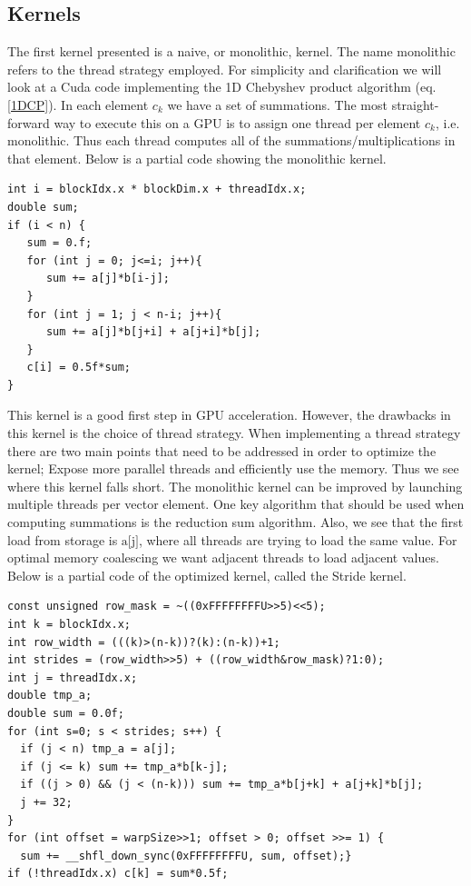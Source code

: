 \documentclass{article}
\begin{document}
\subsection{Kernels}
The first kernel presented is a naive, or monolithic, kernel. The name monolithic refers to the thread strategy employed. For simplicity and clarification we will look at a Cuda code implementing the 1D Chebyshev product algorithm (eq. \ref{1DCP}). In each element $c_k$ we have a set of summations. The most straight-forward way to execute this on a GPU is to assign one thread per element $c_k$, i.e. monolithic. Thus each thread computes all of the summations/multiplications in that element. Below is a partial code showing the monolithic kernel. 
\begin{lstlisting}[caption={Monolithic kernel}]
int i = blockIdx.x * blockDim.x + threadIdx.x;
double sum;
if (i < n) {
   sum = 0.f;
   for (int j = 0; j<=i; j++){
      sum += a[j]*b[i-j];
   }
   for (int j = 1; j < n-i; j++){
      sum += a[j]*b[j+i] + a[j+i]*b[j];
   }
   c[i] = 0.5f*sum;
}
\end{lstlisting}
This kernel is a good first step in GPU acceleration. However, the drawbacks in this kernel is the choice of thread strategy. When implementing a thread strategy there are two main points that need to be addressed in order to optimize the kernel; Expose more parallel threads and efficiently use the memory. Thus we see where this kernel falls short. The monolithic kernel can be improved by launching multiple threads per vector element. One key algorithm that should be used when computing summations is the reduction sum algorithm. Also, we see that the first load from storage is $\text{a[j]}$, where all threads are trying to load the same value. For optimal memory coalescing we want adjacent threads to load adjacent values. Below is a partial code of the optimized kernel, called the Stride kernel.
\begin{lstlisting}[caption={Stride kernel}]
const unsigned row_mask = ~((0xFFFFFFFFU>>5)<<5);
int k = blockIdx.x;
int row_width = (((k)>(n-k))?(k):(n-k))+1;
int strides = (row_width>>5) + ((row_width&row_mask)?1:0);
int j = threadIdx.x;
double tmp_a;
double sum = 0.0f;
for (int s=0; s < strides; s++) {
  if (j < n) tmp_a = a[j];
  if (j <= k) sum += tmp_a*b[k-j];
  if ((j > 0) && (j < (n-k))) sum += tmp_a*b[j+k] + a[j+k]*b[j];
  j += 32;
}
for (int offset = warpSize>>1; offset > 0; offset >>= 1) {
  sum += __shfl_down_sync(0xFFFFFFFFU, sum, offset);}
if (!threadIdx.x) c[k] = sum*0.5f;
\end{lstlisting}
\end{document}
